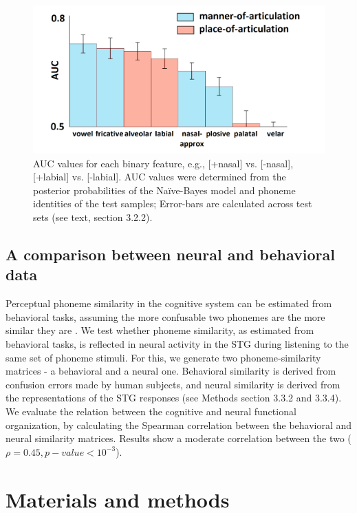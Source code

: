 \begin{figure}[h]
\vspace{.3in}
\includegraphics[width=\linewidth]{Figures/Ch3/Figure5_new.png}
\caption{AUC values for each binary feature, e.g., [+nasal] vs. [-nasal], [+labial] vs. [-labial]. AUC values were determined from the posterior probabilities of the Na\"{i}ve-Bayes model and phoneme identities of the test samples; Error-bars are calculated across test sets (see text, section 3.2.2).}
\end{figure}

\subsection{A comparison between neural and behavioral data}
Perceptual phoneme similarity in the cognitive system can be estimated from behavioral tasks, assuming the more confusable two phonemes are the more similar they are \citep{Tversky1977, Shepard1987}. We test whether phoneme similarity, as estimated from behavioral tasks, is reflected in neural activity in the STG during listening to the same set of phoneme stimuli. For this, we generate two phoneme-similarity matrices - a behavioral and a neural one. Behavioral similarity is derived from confusion errors made by human subjects, and neural similarity is derived from the representations of the STG responses (see Methods section 3.3.2 and 3.3.4). We evaluate the relation between the cognitive and neural functional organization, by calculating the Spearman correlation between the behavioral and neural similarity matrices. Results show a moderate correlation between the two ($\rho = 0.45, p-value < 10^{-3}$).

\section{Materials and methods}

